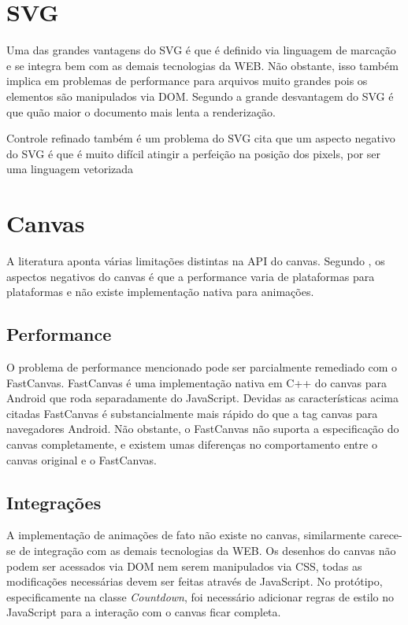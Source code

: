 \section{SVG}

Uma das grandes vantagens do SVG é que é definido via linguagem de
marcação e se integra bem com as demais tecnologias da WEB. Não
obstante, isso também implica em problemas de performance para arquivos
muito grandes pois os elementos são manipulados via DOM. Segundo
\cite{html5mostwanted} a grande desvantagem do SVG é que quão maior o
documento mais lenta a renderização.

Controle refinado também é um problema do SVG \cite{html5mostwanted}
cita que um aspecto negativo do SVG é que é muito difícil atingir a
perfeição na posição dos pixels, por ser uma linguagem vetorizada

\section{Canvas}

A literatura aponta várias limitações distintas na API do canvas.
Segundo \autocite{html5mostwanted}, os aspectos negativos do canvas é
que a performance varia de plataformas para plataformas e não existe
implementação nativa para animações.

\subsection{Performance}

O problema de performance mencionado pode ser parcialmente remediado
com o FastCanvas. FastCanvas é uma implementação nativa em C++ do
canvas para Android que roda separadamente do JavaScript. Devidas as
características acima citadas FastCanvas é substancialmente mais
rápido do que a tag canvas para navegadores Android. Não obstante, o
FastCanvas não suporta a especificação do canvas completamente, e
existem umas diferenças no comportamento entre o canvas original e o
FastCanvas.

\subsection{Integrações}

A implementação de animações de fato não existe no canvas,
similarmente carece-se de integração com as demais tecnologias
da WEB. Os desenhos do canvas não podem ser acessados via DOM nem
serem manipulados via CSS, todas as modificações necessárias devem
ser feitas através de JavaScript.
No protótipo, especificamente na classe \textit{Countdown}, foi necessário
adicionar regras de estilo no JavaScript para a interação com o canvas
ficar completa.

